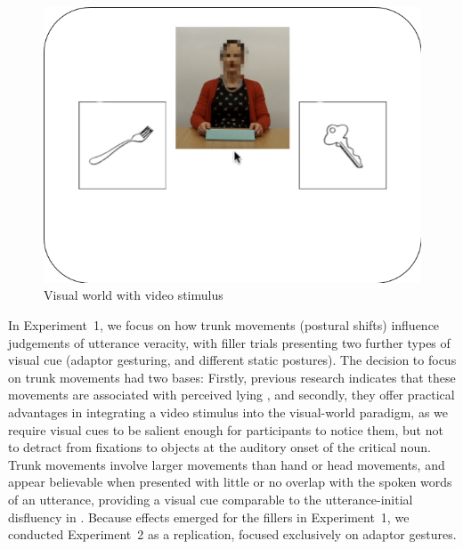 \documentclass[a4paper,man,natbib]{apa6}
\begin{document}
\begin{figure}[Ht]
  \centering
	\includegraphics[width=\linewidth]{./img/e7_layout.png}
  \caption{Visual world with video stimulus}
  \label{fig:v1_layout}
\end{figure}

In Experiment~1, we focus on how trunk movements (postural shifts) influence judgements of utterance veracity, with filler trials presenting two further types of visual cue (adaptor gesturing, and different static postures).
The decision to focus on trunk movements had two bases: Firstly, previous research indicates that these movements are associated with perceived lying \citep{Vrij1996a}, and secondly, they offer practical advantages in integrating a video stimulus into the visual-world paradigm, as we require visual cues to be salient enough for participants to notice them, but not to detract from fixations to objects at the auditory onset of the critical noun.
Trunk movements involve larger movements than hand or head movements, and appear believable when presented with little or no overlap with the spoken words of an utterance, providing a visual cue comparable to the utterance-initial disfluency in \citet{Loy2017}.
Because effects emerged for the fillers in Experiment~1, we conducted Experiment~2 as a replication, focused exclusively on adaptor gestures.
\end{document}
